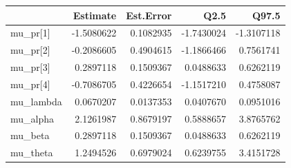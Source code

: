 
\begin{tabular}{lrrrr}
\toprule
  & Estimate & Est.Error & Q2.5 & Q97.5\\
\midrule
mu\_pr[1] & -1.5080622 & 0.1082935 & -1.7430024 & -1.3107118\\
mu\_pr[2] & -0.2086605 & 0.4904615 & -1.1866466 & 0.7561741\\
mu\_pr[3] & 0.2897118 & 0.1509367 & 0.0488633 & 0.6262119\\
mu\_pr[4] & -0.7086705 & 0.4226654 & -1.1517210 & 0.4758087\\
mu\_lambda & 0.0670207 & 0.0137353 & 0.0407670 & 0.0951016\\
\addlinespace
mu\_alpha & 2.1261987 & 0.8679197 & 0.5888657 & 3.8765762\\
mu\_beta & 0.2897118 & 0.1509367 & 0.0488633 & 0.6262119\\
mu\_theta & 1.2494526 & 0.6979024 & 0.6239755 & 3.4151728\\
\bottomrule
\end{tabular}
